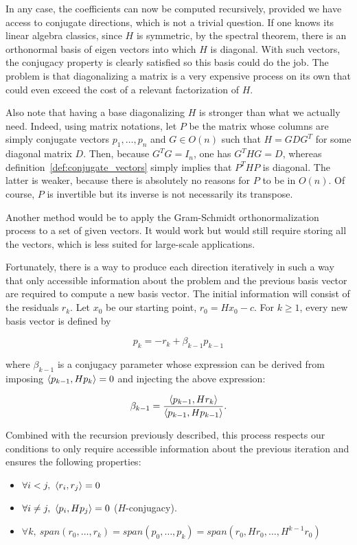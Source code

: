 \documentclass[10pt]{article}
\numberwithin{equation}{section}
\begin{document}
	In any case, the coefficients can now be computed recursively, provided we have access to conjugate directions, which is not a trivial question. If one knows its linear algebra classics, since $H$ is symmetric, by the spectral theorem, there is an orthonormal basis of eigen vectors into which $H$ is diagonal. With such vectors, the conjugacy property is clearly satisfied so this basis could do the job. The problem is that diagonalizing a matrix is a very expensive process on its own that could even exceed the cost of a relevant factorization of $H$. 
	
	Also note that having a base diagonalizing $H$ is stronger than what we actually need. Indeed, using matrix notations, let $P$ be the matrix whose columns are simply conjugate vectors $p_1,\ldots,p_n$ and $G \in O(n)$ such that $H=GDG^T$ for some diagonal matrix $D$. Then, because $G^TG=I_n$, one has $G^THG=D$, whereas definition~\ref{def:conjugate_vectors} simply implies that $P^THP$ is diagonal. The latter is weaker, because there is absolutely no reasons for $P$ to be in $O(n)$. Of course, $P$ is invertible but its inverse is not necessarily its transpose. 
	
	Another method would be to apply the Gram-Schmidt orthonormalization process to a set of given vectors. It would work but would still require storing all the vectors, which is less suited for large-scale applications. 
	
	Fortunately, there is a way to produce each direction iteratively in such a way that only accessible information about the problem and the previous basis vector are required to compute a new basis vector. The initial information will consist of the residuals $r_k$. Let $x_0$ be our starting point, $r_0=Hx_0-c$. For $k\ge 1$, every new basis vector is defined by
	
	\[p_k = -r_k + \beta_{k-1} p_{k-1}\]
	
	where $\beta_{k-1}$ is a conjugacy parameter whose expression can be derived from imposing $\left\langle {p_{k-1}} , {Hp_k} \right\rangle=0$ and injecting the above expression:
	
	\[ \beta_{k-1} = \dfrac{\left\langle {p_{k-1}} , {Hr_k} \right\rangle}{\left\langle {p_{k-1}} , {Hp_{k-1}} \right\rangle}.\]
	
	Combined with the recursion previously described, this process respects our conditions to only require accessible information about the previous iteration and ensures the following properties:
	\begin{itemize}
		\item $\forall i<j,\ \scal{r_i}{r_j}=0$
		\item $\forall i\neq j,\ \scal{p_i}{Hp_j}=0$ ($H$-conjugacy).
		\item $\forall k,\ span(r_0,\ldots,r_k) = span(p_0,\ldots,p_k) = span(r_0,Hr_0,\ldots,H^{k-1}r_0)$
	\end{itemize}
	
\end{document}
